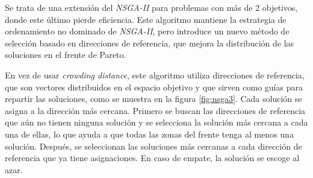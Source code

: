 Se trata de una extensión del \textit{NSGA-II} para problemas con más de 2 objetivos, donde este último pierde eficiencia. Este algoritmo mantiene la estrategia de ordenamiento no dominado de \textit{NSGA-II}, pero introduce un nuevo método de selección basado en direcciones de referencia, que mejora la distribución de las soluciones en el frente de Pareto.

En vez de usar \textit{crowding distance}, este algoritmo utiliza direcciones de referencia, que son vectores distribuidos en el espacio objetivo y que sirven como guías para repartir las soluciones, como se muestra en la figura \ref{fig:nsga3}. Cada solución se asigna a la dirección más cercana. Primero se buscan las direcciones de referencia que aún no tienen ninguna solución y se selecciona la solución más cercana a cada una de ellas, lo que ayuda a que todas las zonas del frente tenga al menos una solución. Después, se seleccionan las soluciones más cercanas a cada dirección de referencia que ya tiene asignaciones. En caso de empate, la solución se escoge al azar.

